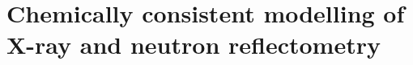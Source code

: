 
\chapter{Chemically consistent modelling of X-ray and neutron reflectometry} %

\label{reflectometry1} %




\pagebreak






\renewcommand\bibsection{\section{\refname}}



